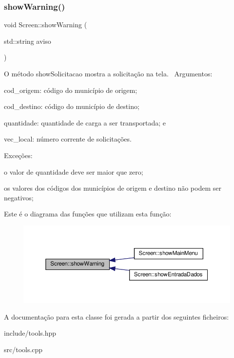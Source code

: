 \subsubsection{\texorpdfstring{show\+Warning()}{showWarning()}}
{\footnotesize\ttfamily void Screen\+::show\+Warning (\begin{DoxyParamCaption}\item[{std\+::string}]{aviso }\end{DoxyParamCaption})}

O método show\+Solicitacao mostra a solicitação na tela.~\newline
Argumentos\+:
\begin{DoxyItemize}
\item cod\+\_\+origem\+: código do município de origem;
\item cod\+\_\+destino\+: código do município de destino;
\item quantidade\+: quantidade de carga a ser transportada; e
\item vec\+\_\+local\+: número corrente de solicitações.
\end{DoxyItemize}

Exceções\+:
\begin{DoxyItemize}
\item o valor de quantidade deve ser maior que zero;
\item os valores dos códigos dos municípios de origem e destino não podem ser negativos;
\end{DoxyItemize}Este é o diagrama das funções que utilizam esta função\+:\nopagebreak
\begin{figure}[H]
\begin{center}
\leavevmode
\includegraphics[width=350pt]{classScreen_a5fc8c4449368a8507f03bf3243677f1e_icgraph}
\end{center}
\end{figure}


A documentação para esta classe foi gerada a partir dos seguintes ficheiros\+:\begin{DoxyCompactItemize}
\item 
include/tools.\+hpp\item 
src/tools.\+cpp\end{DoxyCompactItemize}

